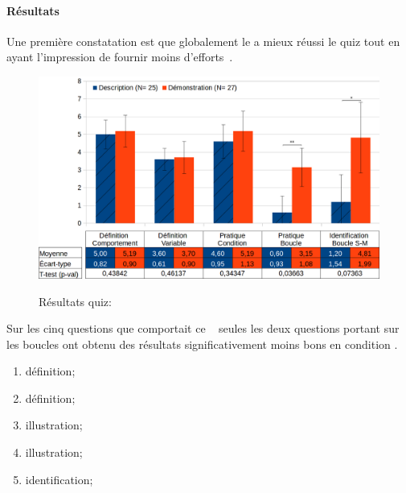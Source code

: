         \paragraph{Résultats}
            Une première constatation est que globalement le  a mieux réussi le quiz tout en ayant l'impression de fournir moins d'efforts~. 
            \begin{figure}[!h]
                \centering
                \includegraphics[width=0.9\linewidth]{Figures/Desprez-result_poule-quiz.png}\label{fig:result_poule-quiz}
                \caption{Résultats quiz: }
            \end{figure}\par%
            Sur les cinq questions que comportait ce ~ seules les deux questions portant sur les boucles ont obtenu des résultats significativement moins bons en condition .
            \begin{enumerate}\myItemStyle
                \item définition; 
                \item définition; 
                \item illustration; 
                \item illustration; 
                \item identification; 
            \end{enumerate}{}
